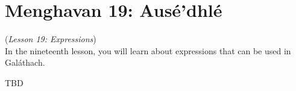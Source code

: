 \section{Menghavan 19: Aus\'{e'}dhl\'{e}}
(\textit{Lesson 19: Expressions})\\

In the nineteenth lesson, you will learn about expressions that can be used in Gal\'{a}thach.

TBD
